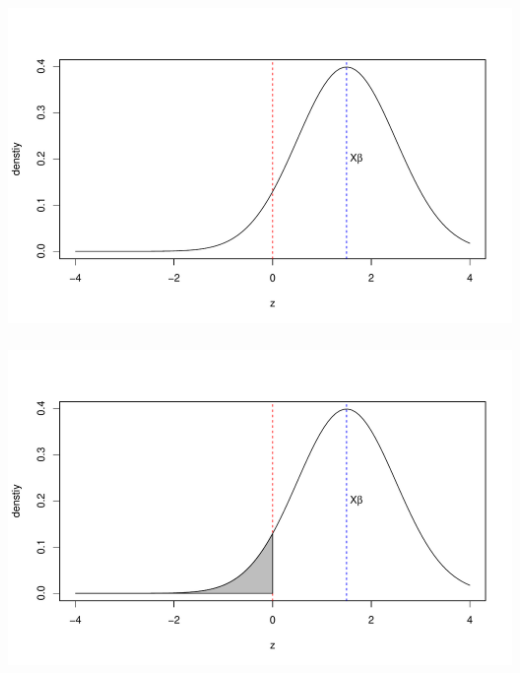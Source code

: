 \begin{frame}[fragile] \frametitle{}

\begin{center}
\includegraphics[width=\textwidth]{img/fig02c}
\end{center}

\end{frame}

\begin{frame}[fragile] \frametitle{}

\begin{center}
\includegraphics[width=\textwidth]{img/fig02d}
\end{center}

\end{frame}

